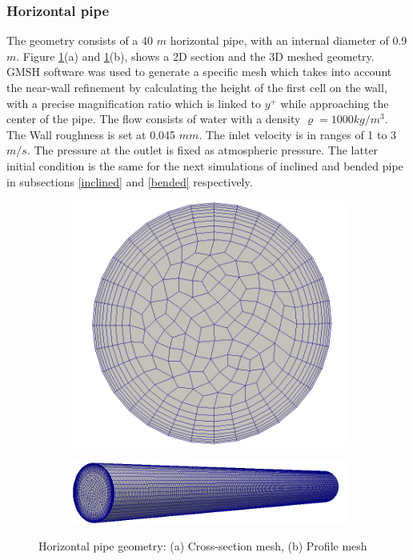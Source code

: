 \documentclass[11pt]{report}
\begin{document}
\subsubsection{Horizontal pipe}
%
The geometry consists of a 40 $m$ horizontal pipe, with an internal diameter of 0.9 $m$. 
%
Figure \ref{horiz}(a) and \ref{horiz}(b), shows a 2D section and the 3D meshed geometry. 
%
GMSH software was used to generate a specific mesh which takes into account the near-wall refinement by calculating the height of the first cell on the wall, with a precise magnification ratio which is linked to $y^{+}$ while approaching the center of the pipe. 
%
The flow consists of water with a density $\varrho=1000 kg/m^3$. 
%
The Wall roughness is set at 0.045 $mm$. The inlet velocity is in ranges of 1 to 3 $m/s$. 
%
The pressure at the outlet is fixed as atmospheric pressure. The latter initial condition is the same for the next simulations of inclined and bended pipe in subsections \ref{inclined} and \ref{bended} respectively.
%
\begin{figure}[ht!]
\centering
\begin{subfigure}{0.40\textwidth}\centering 
\includegraphics[scale=0.09]{figs/section.png}
\caption{}
\end{subfigure}
% 
\begin{subfigure}{0.40\textwidth}\centering 
\includegraphics[scale = 0.25]{figs/HP-2.png}
\caption{}
\end{subfigure}
\caption{Horizontal pipe geometry: (a) Cross-section mesh, (b) Profile mesh }
\label{horiz}
\end{figure}
\end{document}
